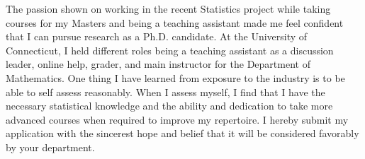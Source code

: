 \documentclass[12pt]{article}
\begin{document}
The passion shown on working in the recent Statistics project while taking courses for my Masters and being a teaching assistant made me feel confident that I can pursue research as a Ph.D. candidate. At the University of Connecticut, I held different roles being a teaching assistant as a discussion leader, online help, grader, and main instructor for the Department of Mathematics. One thing I have learned from exposure to the industry is to be able to self assess reasonably. When I assess myself, I find that I have the necessary statistical knowledge and the ability and dedication to take more advanced courses when required to improve my repertoire. I hereby submit my application with the sincerest hope and belief that it will be considered favorably by your department. \\






\end{document}
